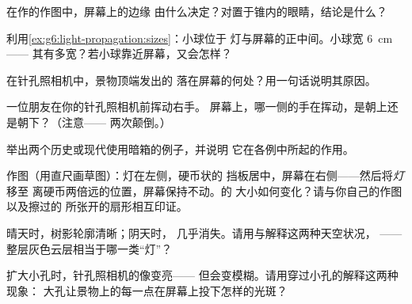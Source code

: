 \begin{exercise}[$\star$]\label{exo:g6:light-propagation:4}
在作的作图中，屏幕上的边缘
由什么决定？对置于锥内的眼睛，结论是什么？
\end{exercise}

\begin{exercise}[$\star$]\label{exo:g6:light-propagation:5}
利用\cref{ex:g6:light-propagation:sizes}：小球位于
灯与屏幕的正中间。小球宽 \qty{6}{cm}——
其有多宽？若小球靠近屏幕，又会怎样？
\end{exercise}

\begin{exercise}[$\star$]\label{exo:g6:light-propagation:6}
在针孔照相机中，景物顶端发出的
落在屏幕的何处？用一句话说明其原因。
\end{exercise}

\begin{exercise}[$\star$]\label{exo:g6:light-propagation:7}
一位朋友在你的针孔照相机前挥动右手。
屏幕上，哪一侧的手在挥动，是朝上还是朝下？（注意——
两次颠倒。）
\end{exercise}

\begin{exercise}[$\star$]\label{exo:g6:light-propagation:8}
举出两个历史或现代使用暗箱的例子，并说明
它在各例中所起的作用。
\end{exercise}

\begin{exercise}[$\star\star$]\label{exo:g6:light-propagation:9}
作图（用直尺画草图）：灯在左侧，硬币状的
挡板居中，屏幕在右侧——然后将\emph{灯}移至
离硬币两倍远的位置，屏幕保持不动。的
大小如何变化？请与你自己的作图以及擦过的
所张开的扇形相互印证。
\end{exercise}

\begin{exercise}[$\star\star$]\label{exo:g6:light-propagation:10}
晴天时，树影轮廓清晰；阴天时，
几乎消失。请用与解释这两种天空状况，
——整层灰色云层相当于哪一类“灯”？
\end{exercise}

\begin{exercise}[$\star\star$]\label{exo:g6:light-propagation:11}
扩大小孔时，针孔照相机的像变亮——
但会变模糊。请用穿过小孔的解释这两种现象：
大孔让景物上的每一点在屏幕上投下怎样的光斑？
\end{exercise}

